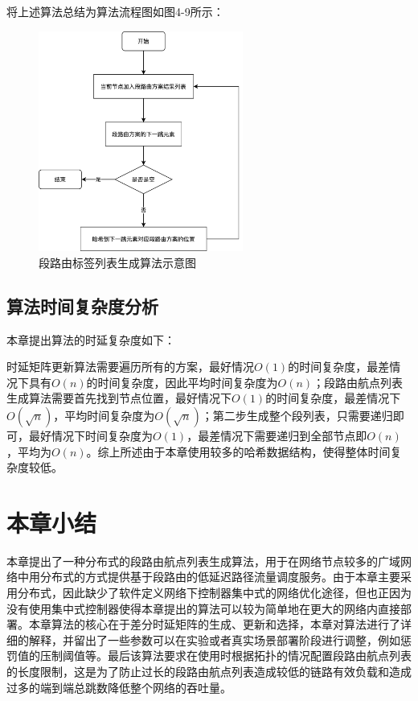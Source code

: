 将上述算法总结为算法流程图如图4-9所示：

\begin{figure}[htbp]
\setlength{\abovecaptionskip}{15pt plus 3pt minus 2pt}
\centerline{\includegraphics[width=0.6\textwidth]{./figures/ch4-sr-init.png}}
\caption{段路由标签列表生成算法示意图}
\label{fig-ch4-sr-init}
\end{figure}

\subsection{算法时间复杂度分析}

本章提出算法的时延复杂度如下：

时延矩阵更新算法需要遍历所有的方案，最好情况$O\left(1\right)$的时间复杂度，最差情况下具有$O\left(n\right)$的时间复杂度，因此平均时间复杂度为$O\left(n\right)$；段路由航点列表生成算法需要首先找到节点位置，最好情况下$O\left(1\right)$的时间复杂度，最差情况下$O\left(\sqrt n\right)$，平均时间复杂度为$O\left(\sqrt n\right)$；第二步生成整个段列表，只需要递归即可，最好情况下时间复杂度为$O\left(1\right)$，最差情况下需要递归到全部节点即$O\left(n\right)$，平均为$O\left(n\right)$。综上所述由于本章使用较多的哈希数据结构，使得整体时间复杂度较低。

\section{本章小结}

本章提出了一种分布式的段路由航点列表生成算法，用于在网络节点较多的广域网络中用分布式的方式提供基于段路由的低延迟路径流量调度服务。由于本章主要采用分布式，因此缺少了软件定义网络下控制器集中式的网络优化途径，但也正因为没有使用集中式控制器使得本章提出的算法可以较为简单地在更大的网络内直接部署。本章算法的核心在于差分时延矩阵的生成、更新和选择，本章对算法进行了详细的解释，并留出了一些参数可以在实验或者真实场景部署阶段进行调整，例如惩罚值的压制阈值等。最后该算法要求在使用时根据拓扑的情况配置段路由航点列表的长度限制，这是为了防止过长的段路由航点列表造成较低的链路有效负载和造成过多的端到端总跳数降低整个网络的吞吐量。

